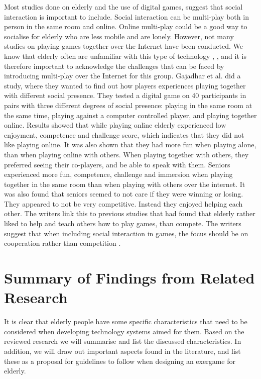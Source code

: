 Most studies done on elderly and the use of digital games, suggest that social interaction is important to include. Social interaction can be multi-play both in person in the same room and online. Online multi-play could be a good way to socialise for elderly who are less mobile and are lonely. However, not many studies on playing games together over the Internet have been conducted. We know that elderly often are unfamiliar with this type of technology \cite{Billis}, \cite{gregor}, and it is therefore important to acknowledge the challenges that can be faced by introducing multi-play over the Internet for this group. Gajadhar et al. \cite{Gajadhar} did a study, where they wanted to find out how players experiences playing together with different social presence. They tested a digital game on 40 participants in pairs with three different degrees of social presence: playing in the same room at the same time, playing against a computer controlled player, and playing together online. Results showed that while playing online elderly experienced low enjoyment, competence and challenge score, which indicates that they did not like playing online. It was also shown that they had more fun when playing alone, than when playing online with others. When playing together with others, they preferred seeing their co-players, and be able to speak with them. Seniors experienced more fun, competence, challenge and immersion when playing together in the same room than when playing with others over the internet. It was also found that seniors seemed to not care if they were winning or losing. They appeared to not be very competitive. Instead they enjoyed helping each other. The writers link this to previous studies that had found that elderly rather liked to help and teach others how to play games, than compete. The writers suggest that when including social interaction in games, the focus should be on cooperation rather than competition \cite{Gajadhar}. 


\section{Summary of Findings from Related Research}
\label{sec:summaryguidelines}
It is clear that elderly people have some specific characteristics that need to be considered when developing technology systems aimed for them. Based on the reviewed research we will summarise and list the discussed characteristics. In addition, we will draw out important aspects found in the literature, and list these as a proposal for guidelines to follow when designing an exergame for elderly.

